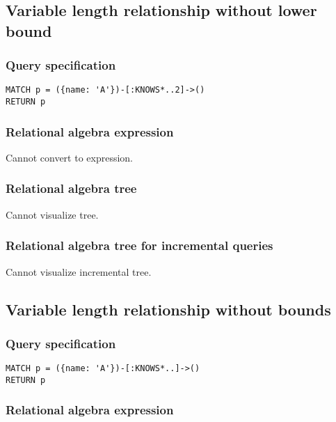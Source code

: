 \subsection{Variable length relationship without lower bound}

\subsubsection*{Query specification}

\begin{lstlisting}
MATCH p = ({name: 'A'})-[:KNOWS*..2]->()
RETURN p
\end{lstlisting}

\subsubsection*{Relational algebra expression}

Cannot convert to expression.

\subsubsection*{Relational algebra tree}

Cannot visualize tree.

\subsubsection*{Relational algebra tree for incremental queries}

Cannot visualize incremental tree.

\subsection{Variable length relationship without bounds}

\subsubsection*{Query specification}

\begin{lstlisting}
MATCH p = ({name: 'A'})-[:KNOWS*..]->()
RETURN p
\end{lstlisting}

\subsubsection*{Relational algebra expression}

